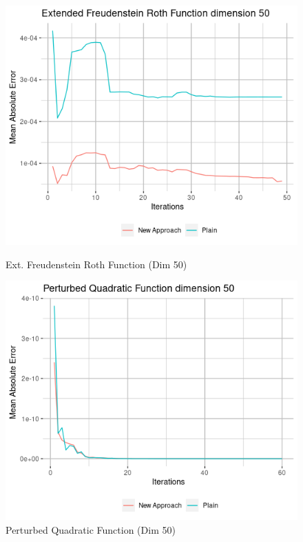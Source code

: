 \documentclass{article}
\begin{document}
\begin{figure}[H] 
	\label{ fig7} 
	\begin{minipage}[b]{0.5\linewidth}
		\centering
		\includegraphics[scale=0.5]{plots/Extended_Freudenstein_Roth_dim50.png} 
		\caption{Ext. Freudenstein Roth Function (Dim 50)} 
		\vspace{4ex}
	\end{minipage}%
	\begin{minipage}[b]{0.5\linewidth}
		\centering
		\includegraphics[scale=0.5]{plots/Perturbed_Quadratic_Function_dim50.png} 
		\caption{Perturbed Quadratic Function (Dim 50)} 

\end{minipage}
\end{figure}
\end{document}

